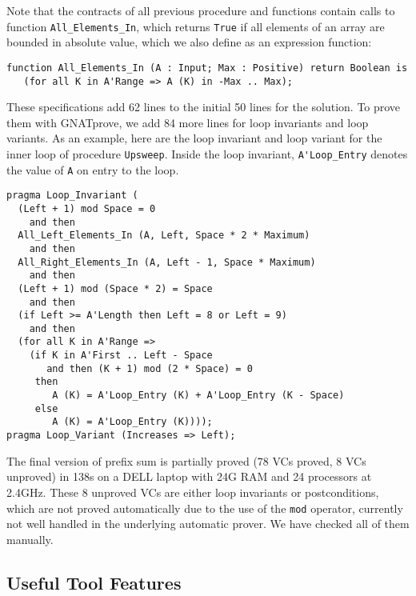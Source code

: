 \documentclass[sttt,draft]{svjour}
\newcommand{\gnatprove}{GNATprove\xspace}
\begin{document}
Note that the contracts of all previous procedure and functions contain calls
to function \verb|All_Elements_In|, which returns \verb|True| if all elements
of an array are bounded in absolute value, which we also define as an
expression function:

\begin{footnotesize}
\begin{verbatim}
function All_Elements_In (A : Input; Max : Positive) return Boolean is
   (for all K in A'Range => A (K) in -Max .. Max);
\end{verbatim}
\end{footnotesize}

These specifications add 62 lines to the initial 50 lines for the solution. To
prove them with \gnatprove, we add 84 more lines for loop invariants and loop
variants. As an example, here are the loop invariant and loop variant for the
inner loop of procedure \verb|Upsweep|. Inside the loop invariant,
\verb|A'Loop_Entry| denotes the value of \verb|A| on entry to the loop.

\begin{footnotesize}
\begin{verbatim}
pragma Loop_Invariant (
  (Left + 1) mod Space = 0
    and then
  All_Left_Elements_In (A, Left, Space * 2 * Maximum)
    and then
  All_Right_Elements_In (A, Left - 1, Space * Maximum)
    and then
  (Left + 1) mod (Space * 2) = Space
    and then
  (if Left >= A'Length then Left = 8 or Left = 9)
    and then
  (for all K in A'Range =>
    (if K in A'First .. Left - Space
       and then (K + 1) mod (2 * Space) = 0
     then
        A (K) = A'Loop_Entry (K) + A'Loop_Entry (K - Space)
     else
        A (K) = A'Loop_Entry (K))));
pragma Loop_Variant (Increases => Left);
\end{verbatim}
\end{footnotesize}

The final version of prefix sum is partially proved (78 VCs proved, 8 VCs
unproved) in 138s on a DELL laptop with 24G RAM and 24 processors at 2.4GHz.
These 8 unproved VCs are either loop invariants or postconditions, which are
not proved automatically due to the use of the \verb|mod| operator, currently
not well handled in the underlying automatic prover. We have checked all of
them manually.

\subsection{Useful Tool Features}
\end{document}
